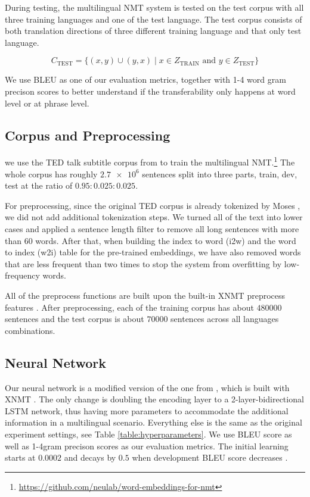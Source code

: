 \documentclass[thesis,fonts=libertine]{cluu}
\begin{document}
During testing, the multilingual NMT system is tested on the test corpus with all three training languages and one of the test language. The test corpus consists of both translation directions of three different training language and that only test language.

\begin{equation*}
  C_{\text{TEST}} = \{(x, y)\cup(y,x) \mid x \in Z_{\text{TRAIN}} \text{ and } y \in Z_{\text{TEST}}\}
\end{equation*}

We use BLEU \parencite{papineni-etal-2002-bleu} as one of our evaluation metrics, together with 1-4 word gram precison scores to better understand if the transferability only happens at word level or at phrase level.

\subsection{Corpus and Preprocessing}

we use the TED talk subtitle corpus from \textcite{Qi:2018aa} to train the multilingual NMT.\footnote{\url{https://github.com/neulab/word-embeddings-for-nmt}} The whole corpus has roughly $\num{2.7e6}$ sentences split into three parts, train, dev, test at the ratio of $0.95:0.025:0.025$.

For preprocessing, since the original TED corpus is already tokenized by Moses \parencite{koehn-etal-2007-moses}, we did not add additional tokenization steps. We turned all of the text into lower cases and applied a sentence length filter to remove all long sentences with more than 60 words. After that, when building the index to word (i2w) and the word to index (w2i) table for the pre-trained embeddings, we have also removed words that are less frequent than two times to stop the system from overfitting by low-frequency words.

All of the preprocess functions are built upon the built-in XNMT preprocess features \parencite{Neubig:2018aa}. After preprocessing, each of the training corpus has about $480000$ sentences and the test corpus is about $70000$ sentences across all languages combinations.

\subsection{Neural Network}

Our neural network is a modified version of the one from \textcite{Qi:2018aa}, which is built with XNMT \parencite{Neubig:2018aa}. The only change is doubling the encoding layer to a 2-layer-bidirectional LSTM network, thus having more parameters to accommodate the additional information in a multilingual scenario. Everything else is the same as the original experiment settings, see Table \ref{table:hyperparameters}. We use BLEU score \parencite{papineni-etal-2002-bleu} as well as 1-4gram precison scores as our evaluation metrics. The initial learning starts at $0.0002$ and decays by $0.5$ when development BLEU score decreases \parencite{Denkowski:2017aa}.
\end{document}
